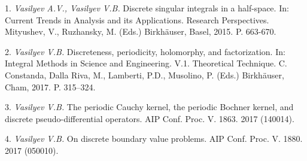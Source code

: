 \litlist

1. \foreignlanguage{english}{
	{\it Vasilyev A.V., Vasilyev V.B.} Discrete singular integrals in a half-space. In:
             Current Trends in Analysis and its Applications. Research Perspectives. Mityushev, V., Ruzhansky, M. (Eds.) Birkh\"auser, Basel, 2015. P. 663-670.
}

2. \foreignlanguage{english}{
	{\it	Vasilyev V.B.} Discreteness, periodicity, holomorphy, and factorization. In: Integral Methods in Science and Engineering. V.1. Theoretical Technique.  C. Constanda, Dalla Riva, M., Lamberti, P.D., Musolino, P. (Eds.)  Birkh\"auser, Cham, 2017. P. 315--324.
}

3. \foreignlanguage{english}{
	{\it Vasilyev V.B.} The periodic Cauchy kernel, the periodic Bochner kernel, and discrete pseudo-differential operators. AIP Conf. Proc.  V. 1863. 2017 (140014).
}

4. \foreignlanguage{english}{
	{\it Vasilyev V.B.} On discrete boundary value problems. AIP Conf. Proc. V. 1880. 2017 (050010).
}

